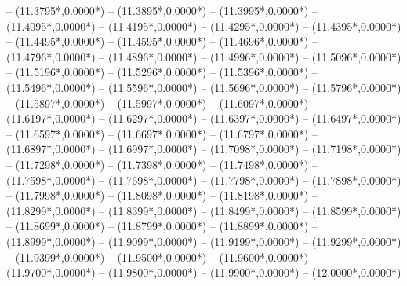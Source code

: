 {	-- ({11.3795*\dx},{0.0000*\dy})
	-- ({11.3895*\dx},{0.0000*\dy})
	-- ({11.3995*\dx},{0.0000*\dy})
	-- ({11.4095*\dx},{0.0000*\dy})
	-- ({11.4195*\dx},{0.0000*\dy})
	-- ({11.4295*\dx},{0.0000*\dy})
	-- ({11.4395*\dx},{0.0000*\dy})
	-- ({11.4495*\dx},{0.0000*\dy})
	-- ({11.4595*\dx},{0.0000*\dy})
	-- ({11.4696*\dx},{0.0000*\dy})
	-- ({11.4796*\dx},{0.0000*\dy})
	-- ({11.4896*\dx},{0.0000*\dy})
	-- ({11.4996*\dx},{0.0000*\dy})
	-- ({11.5096*\dx},{0.0000*\dy})
	-- ({11.5196*\dx},{0.0000*\dy})
	-- ({11.5296*\dx},{0.0000*\dy})
	-- ({11.5396*\dx},{0.0000*\dy})
	-- ({11.5496*\dx},{0.0000*\dy})
	-- ({11.5596*\dx},{0.0000*\dy})
	-- ({11.5696*\dx},{0.0000*\dy})
	-- ({11.5796*\dx},{0.0000*\dy})
	-- ({11.5897*\dx},{0.0000*\dy})
	-- ({11.5997*\dx},{0.0000*\dy})
	-- ({11.6097*\dx},{0.0000*\dy})
	-- ({11.6197*\dx},{0.0000*\dy})
	-- ({11.6297*\dx},{0.0000*\dy})
	-- ({11.6397*\dx},{0.0000*\dy})
	-- ({11.6497*\dx},{0.0000*\dy})
	-- ({11.6597*\dx},{0.0000*\dy})
	-- ({11.6697*\dx},{0.0000*\dy})
	-- ({11.6797*\dx},{0.0000*\dy})
	-- ({11.6897*\dx},{0.0000*\dy})
	-- ({11.6997*\dx},{0.0000*\dy})
	-- ({11.7098*\dx},{0.0000*\dy})
	-- ({11.7198*\dx},{0.0000*\dy})
	-- ({11.7298*\dx},{0.0000*\dy})
	-- ({11.7398*\dx},{0.0000*\dy})
	-- ({11.7498*\dx},{0.0000*\dy})
	-- ({11.7598*\dx},{0.0000*\dy})
	-- ({11.7698*\dx},{0.0000*\dy})
	-- ({11.7798*\dx},{0.0000*\dy})
	-- ({11.7898*\dx},{0.0000*\dy})
	-- ({11.7998*\dx},{0.0000*\dy})
	-- ({11.8098*\dx},{0.0000*\dy})
	-- ({11.8198*\dx},{0.0000*\dy})
	-- ({11.8299*\dx},{0.0000*\dy})
	-- ({11.8399*\dx},{0.0000*\dy})
	-- ({11.8499*\dx},{0.0000*\dy})
	-- ({11.8599*\dx},{0.0000*\dy})
	-- ({11.8699*\dx},{0.0000*\dy})
	-- ({11.8799*\dx},{0.0000*\dy})
	-- ({11.8899*\dx},{0.0000*\dy})
	-- ({11.8999*\dx},{0.0000*\dy})
	-- ({11.9099*\dx},{0.0000*\dy})
	-- ({11.9199*\dx},{0.0000*\dy})
	-- ({11.9299*\dx},{0.0000*\dy})
	-- ({11.9399*\dx},{0.0000*\dy})
	-- ({11.9500*\dx},{0.0000*\dy})
	-- ({11.9600*\dx},{0.0000*\dy})
	-- ({11.9700*\dx},{0.0000*\dy})
	-- ({11.9800*\dx},{0.0000*\dy})
	-- ({11.9900*\dx},{0.0000*\dy})
	-- ({12.0000*\dx},{0.0000*\dy})
}
